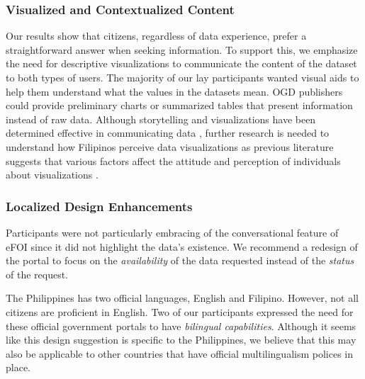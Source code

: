 \documentclass{sigchi}
\begin{document}
\subsubsection{Visualized and Contextualized Content}
Our results show that citizens, regardless of data experience, prefer a straightforward answer when seeking information. To support this, we emphasize the need for descriptive visualizations to communicate the content of the dataset to both types of users. The majority of our lay participants wanted visual aids to help them understand what the values in the datasets mean. OGD publishers could provide preliminary charts or summarized tables that present information instead of raw data. Although storytelling and visualizations have been determined effective in communicating data \cite{Erete2016}, further research is needed to understand how Filipinos perceive data visualizations as previous literature suggests that various factors affect the attitude and perception of individuals about visualizations \cite{Peck2019}. 

\subsubsection{Localized Design Enhancements}
Participants were not particularly embracing of the conversational feature of eFOI since it did not highlight the data's existence. We recommend a redesign of the portal to focus on the \textit{availability} of the data requested instead of the \textit{status} of the request. 

The Philippines has two official languages, English and Filipino. However, not all citizens are proficient in English. Two of our participants expressed the need for these official government portals to have \textit{bilingual capabilities}. Although it seems like this design suggestion is specific to the Philippines, we believe that this may also be applicable to other countries that have official multilingualism polices in place.
\end{document}
